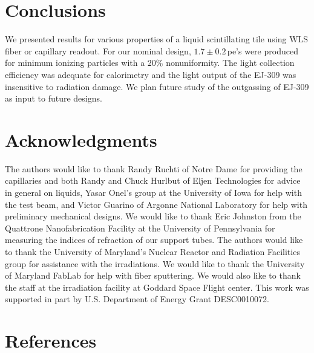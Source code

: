 \documentclass[review]{elsarticle}
\begin{document}
\section{Conclusions}

We presented results for various properties of a liquid scintillating tile using WLS fiber or capillary readout. For our nominal design, $1.7\pm 0.2$\,pe's
were produced for minimum ionizing particles with a 20\% nonuniformity.
The light collection efficiency was adequate for calorimetry and the light output of the EJ-309 was insensitive to radiation damage.  We plan future
study of the outgassing of EJ-309 as input to future designs.


\section{Acknowledgments}
The authors would like to thank Randy Ruchti of Notre Dame for
providing the capillaries and both Randy and Chuck Hurlbut of Eljen
Technologies for
advice in general on liquids,
Yasar Onel's group at the University of
Iowa for help with the test beam, and Victor Guarino of Argonne National Laboratory for
help with preliminary mechanical designs.
We would like to thank Eric
Johnston from the Quattrone Nanofabrication Facility at the University
of Pennsylvania for measuring the indices of refraction of our support
tubes. 
The authors would like to thank 
the University of Maryland's Nuclear Reactor and Radiation
Facilities group for assistance
with the irradiations.
 We would like to thank the University of Maryland
FabLab for help with fiber sputtering.
We would also like to thank the staff at the irradiation facility at Goddard Space Flight center.
This work was supported in part by U.S. Department of Energy
Grant DESC0010072.

\section*{References}


\end{document}
